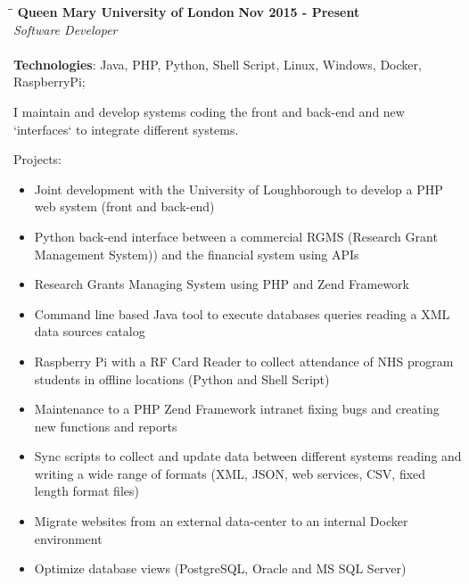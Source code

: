 \documentclass[margin]{res}
\begin{document}
\begin{resume}
\vspace{-0.1in}
   \begin{tabbing}
   \hspace{2.3in}\= \hspace{1.7in}\= \kill %
    \textbf{Queen Mary University of London}    \>\>\textbf{Nov 2015 - Present}\\
    \textit{Software Developer}\\ \\       
    \textbf{Technologies}: Java, PHP, Python, Shell Script, Linux, Windows, Docker, RaspberryPi;
   \end{tabbing}\vspace{-20pt}      %
    \vspace{2mm}
    I maintain and develop systems coding the front and back-end and new `interfaces` to integrate different systems. 

    Projects:
    \begin{itemize}
      \item Joint development with the University of Loughborough to develop a PHP web system (front and back-end)
      \item Python back-end interface between a commercial RGMS (Research Grant Management System)) and the financial system using APIs
      \item Research Grants Managing System using PHP and Zend Framework
      \item Command line based Java tool to execute databases queries reading a XML data sources catalog
      \item Raspberry Pi with a RF Card Reader to collect attendance of NHS program students in offline locations (Python and Shell Script)
      \item Maintenance to a PHP Zend Framework intranet fixing bugs and creating new functions and reports
      \item Sync scripts to collect and update data between different systems reading and writing a wide range of formats (XML, JSON, web services, CSV, fixed length format files)
      \item Migrate websites from an external data-center to an internal Docker environment
      \item Optimize database views (PostgreSQL, Oracle and MS SQL Server)
    \end{itemize}

\vspace{5.0in}




\end{resume}
\end{document}
